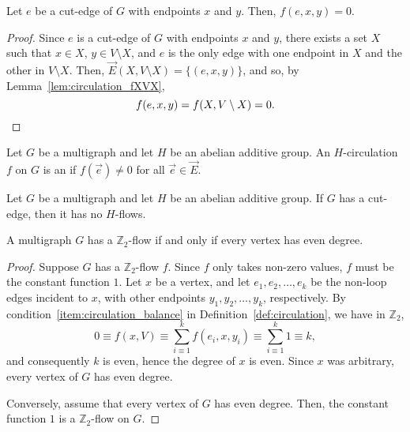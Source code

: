 \begin{corollary} \label{cor:circulation_cut_edge}
	Let \(e\) be a cut-edge of \(G\) with endpoints \(x\) and \(y\).
	Then, \(f(e, x, y) = 0\).
\end{corollary}

\begin{proof}
	Since \(e\) is a cut-edge of \(G\) with endpoints \(x\) and \(y\),
	there exists a set \(X\) such that \(x \in X\), \(y \in V \setminus X\), and \(e\) is the only edge with one endpoint in \(X\) and the other in \(V \setminus X\).
	Then, \(\vec{E}(X, V \setminus X) = \{(e, x, y)\}\), and so, by Lemma~\ref{lem:circulation_fXVX},
	\begin{equation}
		f(e, x, y) = f(X, V \setminus X) = 0. \qedhere
	\end{equation}
\end{proof}

\begin{definition}[\(H\)-flow]
	Let \(G\) be a multigraph and let \(H\) be an abelian additive group.
	An \(H\)-circulation \(f\) on \(G\) is an  if \(f(\vec{e}) \neq 0\) for all \(\vec{e} \in \vec{E}\).
\end{definition}

\begin{corollary} \label{cor:flow_cut_edge}
	Let \(G\) be a multigraph and let \(H\) be an abelian additive group.
	If \(G\) has a cut-edge, then it has no \(H\)-flows.
\end{corollary}

\begin{proposition}
	A multigraph \(G\) has a \(\mathbb{Z}_2\)-flow if and only if every vertex has even degree.
\end{proposition}

\begin{proof}
	Suppose \(G\) has a \(\mathbb{Z}_2\)-flow \(f\).
	Since \(f\) only takes non-zero values, \(f\) must be the constant function \(1\).
	Let \(x\) be a vertex, and let \(e_1, e_2, \ldots, e_{k}\) be the non-loop edges incident to \(x\), with other endpoints \(y_1, y_2, \ldots, y_{k}\), respectively.
	By condition~\ref{item:circulation_balance} in Definition~\ref{def:circulation}, we have in \(\mathbb{Z}_2\),
	\begin{equation}
		0 \equiv f(x, V) \equiv \sum_{i \equiv 1}^{k} f(e_i, x, y_i) \equiv \sum_{i \equiv 1}^k 1 \equiv k,
	\end{equation}
	and consequently \(k\) is even, hence the degree of \(x\) is even.
	Since \(x\) was arbitrary, every vertex of \(G\) has even degree.

	Conversely, assume that every vertex of \(G\) has even degree.
	Then, the constant function \(1\) is a \(\mathbb{Z}_2\)-flow on \(G\).
\end{proof}

